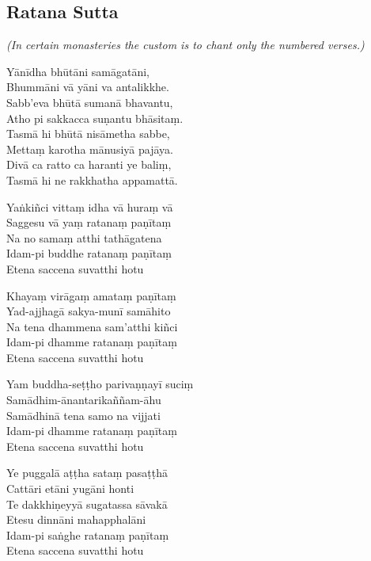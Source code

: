 \subsection{Ratana Sutta}


\emph{(In certain monasteries the custom is to chant only the numbered verses.)}

\begin{paritta}

Yānīdha bhūtāni samāgatāni,\\
Bhummāni vā yāni va antalikkhe.\\
Sabb'eva bhūtā sumanā bhavantu,\\
Atho pi sakkacca suṇantu bhāsitaṃ.\\
Tasmā hi bhūtā nisāmetha sabbe,\\
Mettaṃ karotha mānusiyā pajāya.\\
Divā ca ratto ca haranti ye baliṃ,\\
Tasmā hi ne rakkhatha appamattā.


\label{yankinci-vittam}
%
Yaṅkiñci vittaṃ idha vā huraṃ vā\\
Saggesu vā yaṃ ratanaṃ paṇītaṃ\\
Na no samaṃ atthi tathāgatena\\
Idam-pi buddhe ratanaṃ paṇītaṃ\\
Etena saccena suvatthi hotu

\clearpage

%
Khayaṃ virāgaṃ amataṃ paṇītaṃ\\
Yad-ajjhagā sakya-munī samāhito\\
Na tena dhammena sam'atthi kiñci\\
Idam-pi dhamme ratanaṃ paṇītaṃ\\
Etena saccena suvatthi hotu

%
Yam buddha-seṭṭho parivaṇṇayī suciṃ\\
Samādhim-ānantarikaññam-āhu\\
Samādhinā tena samo na vijjati\\
Idam-pi dhamme ratanaṃ paṇītaṃ\\
Etena saccena suvatthi hotu

%
Ye puggalā aṭṭha sataṃ pasaṭṭhā\\
Cattāri etāni yugāni honti\\
Te dakkhiṇeyyā sugatassa sāvakā\\
Etesu dinnāni mahapphalāni\\
Idam-pi saṅghe ratanaṃ paṇītaṃ\\
Etena saccena suvatthi hotu


\end{paritta}
